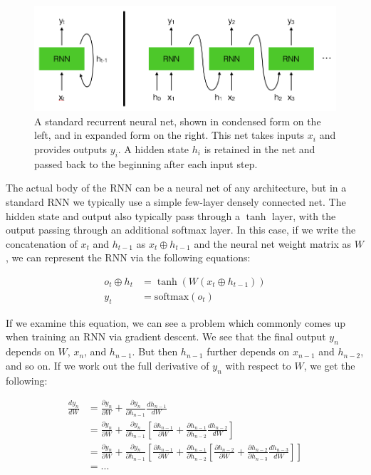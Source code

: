 \begin{figure}[htbp]
    \centering
    \includegraphics[width=\linewidth]{Images/ML/RNN.png}
    \caption{A standard recurrent neural net, shown in condensed form on the left, and in expanded form on the right. This net takes inputs $x_i$ and provides outputs $y_i$. A hidden state $h_i$ is retained in the net and passed back to the beginning after each input step.}
    \label{fig:RNN}
\end{figure}

The actual body of the RNN can be a neural net of any architecture, but in a standard RNN we typically use a simple few-layer densely connected net. The hidden state and output also typically pass through a $\tanh$ layer, with the output passing through an additional softmax layer. In this case, if we write the concatenation of $x_t$ and $h_{t-1}$ as $x_t \oplus h_{t-1}$ and the neural net weight matrix as $W$, we can represent the RNN via the following equations:

\begin{align}
    o_t\oplus h_t&=\tanh(W(x_t\oplus h_{t-1})) \\
    y_t&=\text{softmax}(o_t)
\end{align}

If we examine this equation, we can see a problem which commonly comes up when training an RNN via gradient descent. We see that the final output $y_n$ depends on $W$, $x_n$, and $h_{n-1}$. But then $h_{n-1}$ further depends on $x_{n-1}$ and $h_{n-2}$, and so on. If we work out the full derivative of $y_n$ with respect to $W$, we get the following:

\begin{align}
    \frac{dy_n}{dW}&=\frac{\partial y_n}{\partial W} + \frac{\partial y_n}{\partial h_{n-1}}\frac{dh_{n-1}}{dW} \\
    &=\frac{\partial y_n}{\partial W} + \frac{\partial y_n}{\partial h_{n-1}}[\frac{\partial h_{n-1}}{\partial W} + \frac{\partial h_{n-1}}{\partial h_{n-2}}\frac{dh_{n-2}}{dW}] \\
    &=\frac{\partial y_n}{\partial W} + \frac{\partial y_n}{\partial h_{n-1}}[\frac{\partial h_{n-1}}{\partial W} + \frac{\partial h_{n-1}}{\partial h_{n-2}}[
    \frac{\partial h_{n-2}}{\partial W} + \frac{\partial h_{n-2}}{\partial h_{n-3}}\frac{dh_{n-3}}{dW}
    ]] \\
    &=... \nonumber
\end{align}

